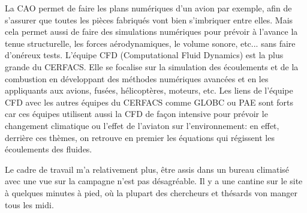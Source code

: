 La CAO permet de faire les plans numériques d'un avion par exemple, afin de s'assurer que toutes les pièces fabriqués vont bien s'imbriquer entre elles. Mais cela permet aussi de faire des simulations numériques pour prévoir à l'avance la tenue structurelle, les forces aérodynamiques, le volume sonore, etc... sans faire d'onéreux tests.
L'équipe CFD (Computational Fluid Dynamics) est la plus grande du CERFACS. Elle se focalise sur la simulation des écoulements et de la combustion en développant des méthodes numériques avancées et en les appliquants aux avions, fusées, hélicoptères, moteurs, etc. Les liens de l’équipe CFD avec les autres équipes du CERFACS comme GLOBC ou PAE  sont forts car ces équipes utilisent aussi la CFD de façon intensive pour prévoir le changement climatique ou l’effet de l’aviaton sur l’environnement: en effet, derrière ces thèmes, on retrouve en premier les équations qui régissent les écoulements des fluides.






Le cadre de travail m'a relativement plus, être assis dans un bureau climatisé avec une vue sur la campagne n'est pas désagréable. Il y a une cantine sur le site à quelques minutes à pied, où la plupart des chercheurs et thésards von manger tous les midi.



